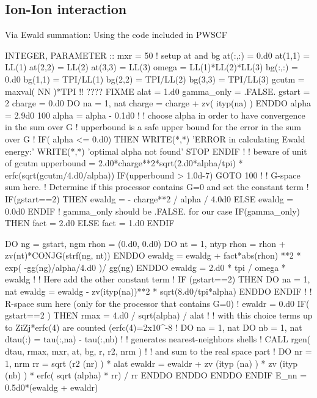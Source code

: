 \subsection{Ion-Ion interaction}

Via Ewald summation:
Using the code included in PWSCF
\begin{fortrancode}
INTEGER, PARAMETER :: mxr = 50
! setup at and bg
at(:,:) = 0.d0
at(1,1) = LL(1)
at(2,2) = LL(2)
at(3,3) = LL(3)
omega = LL(1)*LL(2)*LL(3)
bg(:,:) = 0.d0
bg(1,1) = TPI/LL(1)
bg(2,2) = TPI/LL(2)
bg(3,3) = TPI/LL(3)
gcutm = maxval( NN )*TPI  !! ???? FIXME
alat = 1.d0
gamma_only = .FALSE.
gstart = 2
charge = 0.d0
DO na = 1, nat
   charge = charge + zv( ityp(na) )
ENDDO
alpha = 2.9d0
100 alpha = alpha - 0.1d0
!
! choose alpha in order to have convergence in the sum over G
! upperbound is a safe upper bound for the error in the sum over G
!
IF( alpha <= 0.d0) THEN 
  WRITE(*,*) 'ERROR in calculating Ewald energy:'
  WRITE(*,*) 'optimal alpha not found'
  STOP 
ENDIF 
!
! beware of unit of gcutm
upperbound = 2.d0*charge**2*sqrt(2.d0*alpha/tpi) * erfc(sqrt(gcutm/4.d0/alpha))  
IF(upperbound > 1.0d-7) GOTO 100
!
! G-space sum here.
! Determine if this processor contains G=0 and set the constant term
!
IF(gstart==2) THEN 
  ewaldg = - charge**2 / alpha / 4.0d0
ELSE 
  ewaldg = 0.0d0
ENDIF 
! gamma_only should be .FALSE. for our case
IF(gamma_only) THEN 
  fact = 2.d0
ELSE
  fact = 1.d0
ENDIF 

DO ng = gstart, ngm
  rhon = (0.d0, 0.d0)
  DO nt = 1, ntyp
    rhon = rhon + zv(nt)*CONJG(strf(ng, nt))
  ENDDO
  ewaldg = ewaldg + fact*abs(rhon) **2 * exp( -gg(ng)/alpha/4.d0 )/ gg(ng)
ENDDO
ewaldg = 2.d0 * tpi / omega * ewaldg
!
!  Here add the other constant term
!
IF (gstart==2) THEN 
  DO na = 1, nat
    ewaldg = ewaldg - zv(ityp(na))**2 * sqrt(8.d0/tpi*alpha)
  ENDDO
ENDIF 
!
! R-space sum here (only for the processor that contains G=0)
!
ewaldr = 0.d0
IF( gstart==2 ) THEN 
  rmax = 4.d0 / sqrt(alpha) / alat
  !
  ! with this choice terms up to ZiZj*erfc(4) are counted (erfc(4)=2x10^-8
  !
  DO na = 1, nat
    DO nb = 1, nat
      dtau(:) = tau(:,na) - tau(:,nb)
      !
      ! generates nearest-neighbors shells
      !
      CALL rgen( dtau, rmax, mxr, at, bg, r, r2, nrm )
      !
      ! and sum to the real space part
      !
      DO nr = 1, nrm
        rr = sqrt (r2 (nr) ) * alat
        ewaldr = ewaldr + zv (ityp (na) ) * zv (ityp (nb) ) * erfc( sqrt (alpha) * rr) / rr
      ENDDO 
    ENDDO 
  ENDDO 
ENDIF 
E_nn = 0.5d0*(ewaldg + ewaldr)
\end{fortrancode}
